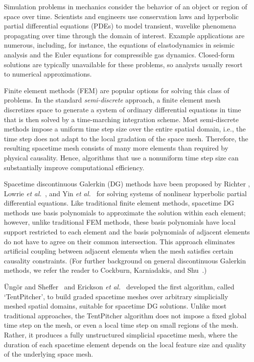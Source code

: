 \documentclass[twocolumn]{article}
\def\etal{\textsl{et al.}}
\def\Ungor{\"Ung\"or}
\begin{document}
Simulation problems in mechanics consider the behavior of an object or
region of space over time.  Scientists and engineers use conservation
laws and hyperbolic partial differential equations (PDEs) to model
transient, wavelike phenomena propagating over time through the domain
of interest.  Example applications are numerous, including, for
instance, the equations of elastodynamics in seismic analysis and the
Euler equations for compressible gas dynamics.  Closed-form solutions
are typically unavailable for these problems, so analysts usually
resort to numerical approximations.

Finite element methods (FEM) are popular options for solving this
class of problems.  In the standard \emph{semi-discrete} approach, a
finite element mesh discretizes space to generate a system of ordinary
differential equations in time that is then solved by a time-marching
integration scheme.  Most semi-discrete methods impose a uniform time
step size over the entire spatial domain, i.e., the time step does not
adapt to the local gradation of the space mesh.  Therefore, the
resulting spacetime mesh consists of many more elements than required
by physical causality.  Hence, algorithms that use a nonuniform time
step size can substantially improve computational efficiency.

Spacetime discontinuous Galerkin (DG) methods have been proposed by
Richter \cite{Richter94}, Lowrie \etal~\cite{Lowrie98}, and Yin
\etal~\cite{YinASHT00} for solving systems of nonlinear hyperbolic
partial differential equations.  Like traditional finite element
methods, spacetime DG methods use basis polynomials to approximate the
solution within each element; however, unlike traditional FEM methods,
these basis polynomials have local support restricted to each element
and the basis polynomials of adjacent elements do not have to agree on
their common intersection.  This approach eliminates artificial
coupling between adjacent elements when the mesh satisfies certain
causality constraints.  (For further background on general
discontinuous Galerkin methods, we refer the reader to Cockburn,
Karniadakis, and Shu~\cite{CockburnKS00}.)

\Ungor{} and Sheffer~\cite{ungor00tentpitcher} and Erickson
\etal~\cite{erickson02building} developed the first algorithm, called `TentPitcher', to build
graded spacetime meshes over arbitrary simplicially meshed spatial
domains, suitable for spacetime DG solutions.  Unlike most traditional
approaches, the TentPitcher algorithm does not impose a fixed global
time step on the mesh, or even a local time step on small regions of
the mesh.  Rather, it produces a fully unstructured simplicial
spacetime mesh, where the duration of each spacetime element depends
on the local feature size and quality of the underlying space mesh.
\end{document}
